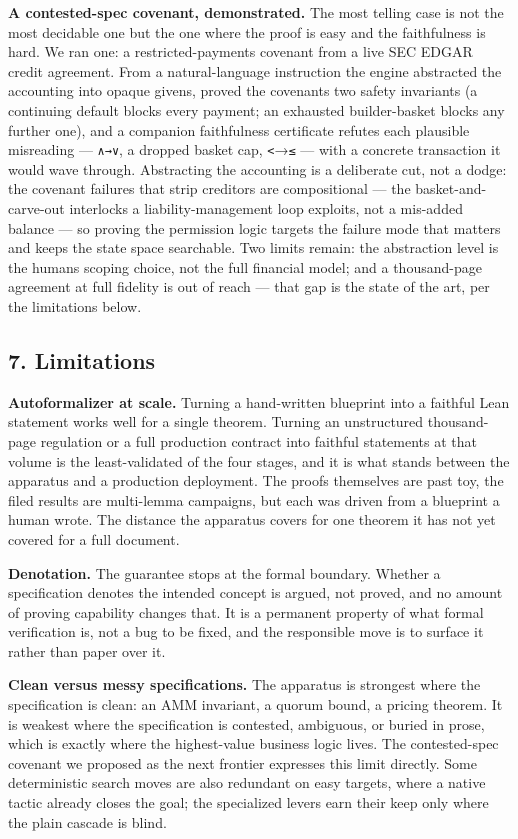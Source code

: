 \documentclass[
  11pt,
]{article}
\renewcommand{\_}{\origunderscore\allowbreak}
\begin{document}
\textbf{A contested-spec covenant, demonstrated.} The most telling case
is not the most decidable one but the one where the proof is easy and
the faithfulness is hard. We ran one: a restricted-payments covenant
from a live SEC EDGAR credit agreement. From a natural-language
instruction the engine abstracted the accounting into opaque givens,
proved the covenant\textquotesingle s two safety invariants (a
continuing default blocks every payment; an exhausted builder-basket
blocks any further one), and a companion faithfulness certificate
refutes each plausible misreading --- \texttt{∧→∨}, a dropped basket
cap, \texttt{\textless{}}→\texttt{≤} --- with a concrete transaction it
would wave through. Abstracting the accounting is a deliberate cut, not
a dodge: the covenant failures that strip creditors are compositional
--- the basket-and-carve-out interlocks a liability-management loop
exploits, not a mis-added balance --- so proving the permission logic
targets the failure mode that matters and keeps the state space
searchable. Two limits remain: the abstraction level is the
human\textquotesingle s scoping choice, not the full financial model;
and a thousand-page agreement at full fidelity is out of reach --- that
gap is the state of the art, per the limitations below.

\subsection{7. Limitations}\label{7-limitations}

\textbf{Autoformalizer at scale.} Turning a hand-written blueprint into
a faithful Lean statement works well for a single theorem. Turning an
unstructured thousand-page regulation or a full production contract into
faithful statements at that volume is the least-validated of the four
stages, and it is what stands between the apparatus and a production
deployment. The proofs themselves are past toy, the filed results are
multi-lemma campaigns, but each was driven from a blueprint a human
wrote. The distance the apparatus covers for one theorem it has not yet
covered for a full document.

\textbf{Denotation.} The guarantee stops at the formal boundary. Whether
a specification denotes the intended concept is argued, not proved, and
no amount of proving capability changes that. It is a permanent property
of what formal verification is, not a bug to be fixed, and the
responsible move is to surface it rather than paper over it.

\textbf{Clean versus messy specifications.} The apparatus is strongest
where the specification is clean: an AMM invariant, a quorum bound, a
pricing theorem. It is weakest where the specification is contested,
ambiguous, or buried in prose, which is exactly where the highest-value
business logic lives. The contested-spec covenant we proposed as the
next frontier expresses this limit directly. Some deterministic search
moves are also redundant on easy targets, where a native tactic already
closes the goal; the specialized levers earn their keep only where the
plain cascade is blind.
\end{document}
